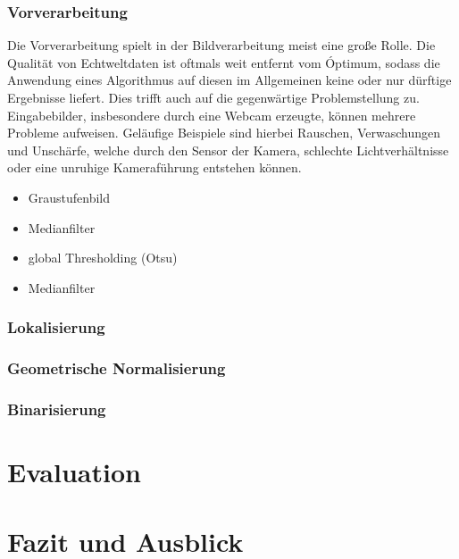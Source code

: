 \documentclass[a4paper, oneside, 12pt]{article}
\begin{document}
\subsubsection{Vorverarbeitung}
Die Vorverarbeitung spielt in der Bildverarbeitung meist eine große Rolle. Die Qualität von Echtweltdaten ist oftmals weit entfernt vom Óptimum, sodass die Anwendung eines Algorithmus auf diesen im Allgemeinen keine oder nur dürftige Ergebnisse liefert.
Dies trifft auch auf die gegenwärtige Problemstellung zu. Eingabebilder, insbesondere durch eine Webcam erzeugte, können mehrere Probleme aufweisen.
Geläufige Beispiele sind hierbei Rauschen, Verwaschungen und Unschärfe, welche durch den Sensor der Kamera, schlechte Lichtverhältnisse oder eine unruhige Kameraführung entstehen können.

\begin{itemize}
	\item Graustufenbild
	\item Medianfilter
	\item global Thresholding (Otsu)
	\item Medianfilter
\end{itemize}

\subsubsection{Lokalisierung}

\subsubsection{Geometrische Normalisierung}

\subsubsection{Binarisierung}

\section{Evaluation}

\section{Fazit und Ausblick}
	
\end{document}
